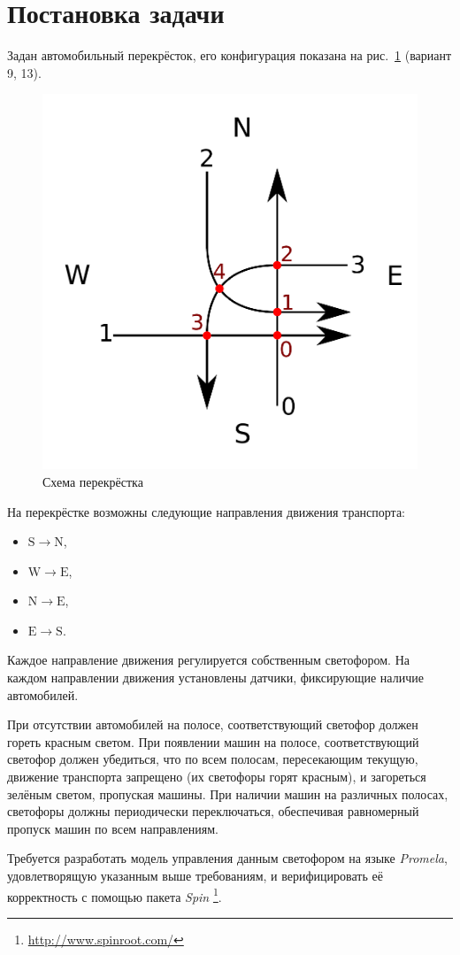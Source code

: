 \documentclass[a4paper,10pt]{article}
\begin{document}


\tableofcontents
\pagebreak


\section{Постановка задачи}
Задан автомобильный перекрёсток, его конфигурация показана на рис.~\ref{fig:crossroad} (вариант 9, 13).
\begin{figure}[h!]
  \centering
  \includegraphics[width=0.5\linewidth]{./data/crossroad.pdf}
  \caption{Схема перекрёстка}
  \label{fig:crossroad}
\end{figure}
На перекрёстке возможны следующие направления движения транспорта:
\begin{itemize}
  \item $\mathrm{S} \rightarrow \mathrm{N}$,
  \item $\mathrm{W} \rightarrow \mathrm{E}$,
  \item $\mathrm{N} \rightarrow \mathrm{E}$,
  \item $\mathrm{E} \rightarrow \mathrm{S}$.
\end{itemize}
Каждое направление движения регулируется собственным светофором.
На каждом направлении движения установлены датчики, фиксирующие наличие автомобилей.

При отсутствии автомобилей на полосе, соответствующий светофор должен гореть красным светом.
При появлении машин на полосе, соответствующий светофор должен убедиться, 
что по всем полосам, пересекающим текущую, движение транспорта запрещено 
(их светофоры горят красным), и загореться зелёным светом, пропуская машины.
При наличии машин на различных полосах, светофоры должны периодически переключаться, 
обеспечивая равномерный пропуск машин по всем направлениям.

Требуется разработать модель управления данным светофором на языке \textit{Promela}, 
удовлетворящую указанным выше требованиям, 
и верифицировать её корректность с помощью пакета \textit{Spin}%
\footnote{\url{http://www.spinroot.com/}}.
\end{document}
